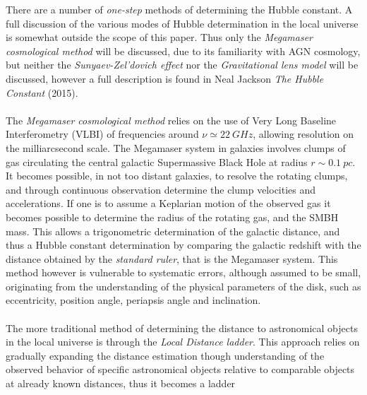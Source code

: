 \documentclass[a4paper, 12pt, twoside]{article}
\begin{document}
There are a number of \emph{one-step} methods of determining the Hubble constant. A full discussion of the various modes of Hubble determination in the local universe is somewhat outside the scope of this paper. Thus only the \emph{Megamaser cosmological method} will be discussed, due to its  familiarity with AGN cosmology, but neither the \emph{Sunyaev-Zel'dovich effect} nor the \emph{Gravitational lens model} will be discussed, however a full description is found in Neal Jackson \emph{The Hubble Constant} (2015). \\
\\
The \emph{Megamaser cosmological method} relies on the use of Very Long Baseline Interferometry (VLBI) of frequencies around $\nu \simeq 22\ GHz$, allowing resolution on the milliarcsecond scale. The Megamaser system in galaxies involves clumps of gas circulating the central galactic Supermassive Black Hole at radius $r \sim 0.1\ pc$. It becomes possible, in not too distant galaxies, to resolve the rotating clumps, and through continuous observation determine the clump velocities and accelerations. If one is to assume a Keplarian motion of the observed gas it becomes possible to determine the radius of the rotating gas, and the SMBH mass. This allows a trigonometric determination of the galactic distance, and thus a Hubble constant determination by comparing the galactic redshift with the distance obtained by the \emph{standard ruler}, that is the Megamaser system. This method however is vulnerable to systematic errors, although assumed to be small, originating from the understanding of the physical parameters of the disk, such as eccentricity, position angle, periapsis angle and inclination. \\
\\
The more traditional method of determining the distance to astronomical objects in the local universe is through the \emph{Local Distance ladder}. This approach relies on gradually expanding the distance estimation though understanding of the observed behavior of specific astronomical objects relative to comparable objects at already known distances, thus it becomes a ladder
\end{document}
